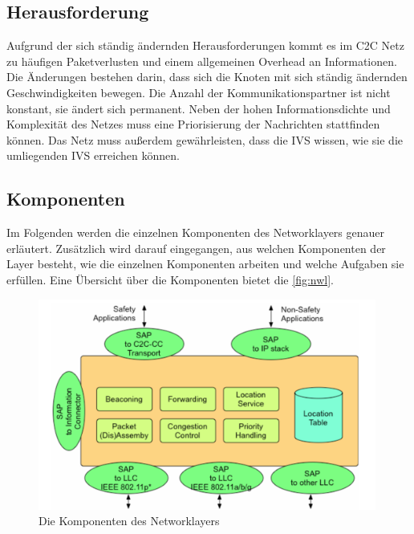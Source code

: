 \subsection{Herausforderung}
Aufgrund der sich ständig ändernden Herausforderungen kommt es im \ac{C2C} Netz zu häufigen Paketverlusten und einem allgemeinen Overhead an Informationen. Die Änderungen bestehen darin, dass sich die Knoten mit sich ständig ändernden Geschwindigkeiten bewegen. Die Anzahl der Kommunikationspartner ist nicht konstant, sie ändert sich permanent. Neben der hohen Informationsdichte und Komplexität des Netzes muss eine Priorisierung der Nachrichten stattfinden können. Das Netz muss außerdem gewährleisten, dass die \ac{IVS} wissen, wie sie die umliegenden \ac{IVS} erreichen können.

\subsection{Komponenten}
Im Folgenden werden die einzelnen Komponenten des Networklayers genauer erläutert. Zusätzlich wird darauf eingegangen, aus welchen Komponenten der Layer besteht, wie die einzelnen Komponenten arbeiten und welche Aufgaben sie erfüllen. Eine Übersicht über die Komponenten bietet die \autoref{fig:nwl}. 

\begin{figure}
	\includegraphics[width=0.99\textwidth]{content/images/03_networklayer/networklayer.png}
	\caption{Die Komponenten des Networklayers\cite{C2C-manifesto}}
	\label{fig:nwl}
\end{figure}

